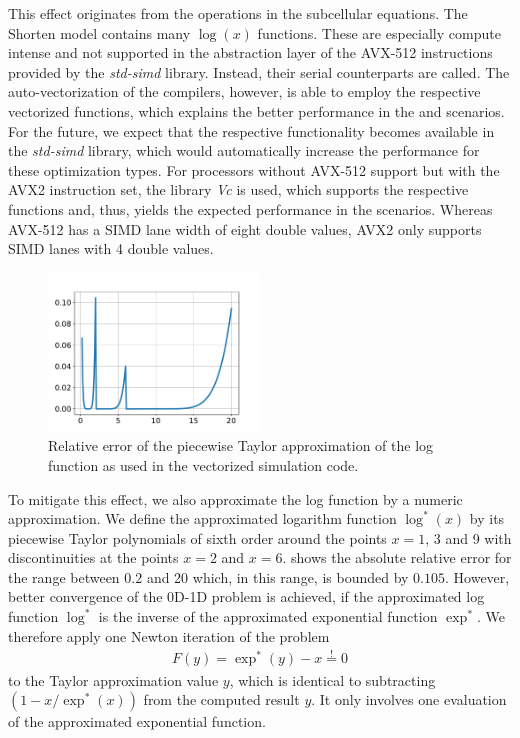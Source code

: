 This effect originates from the operations in the subcellular equations. The Shorten model contains many $\log(x)$ functions. These are especially compute intense and not supported in the abstraction layer of the AVX-512 instructions provided by the \emph{std-simd} library. Instead, their serial counterparts are called. The auto-vectorization of the compilers, however, is able to employ the respective vectorized functions, which explains the better performance in the  and  scenarios. For the future, we expect that the respective functionality becomes available in the \emph{std-simd} library, which would automatically increase the performance for these optimization types. For processors without AVX-512 support but with the AVX2 instruction set, the library \emph{Vc} is used, which supports the respective functions and, thus, yields the expected performance in the  scenarios. Whereas AVX-512 has a SIMD lane width of eight double values, AVX2 only supports SIMD lanes with 4 double values.

\begin{figure}
  \centering%
  \includegraphics[width=0.5\textwidth]{images/results/studies/apxlog.pdf}%
  \caption{Relative error of the piecewise Taylor approximation of the log function as used in the vectorized simulation code.}%
  \label{fig:apxlog}%
\end{figure}%
To mitigate this effect, we also approximate the log function by a numeric approximation. We define the approximated logarithm function $\log^\ast(x)$ by its piecewise Taylor polynomials of sixth order around the points $x=1$, 3 and 9 with discontinuities at the points $x=2$ and $x=6$.  shows the absolute relative error for the range between $0.2$ and 20 which, in this range, is bounded by $0.105$. However, better convergence of the 0D-1D problem is achieved, if the approximated log function $\log^\ast$ is the inverse of the approximated exponential function $\exp^\ast$. We therefore apply one Newton iteration of the problem %
\begin{align*}
  F(y) = \exp^\ast(y)-x \overset{!}{=} 0  
\end{align*}
%
to the Taylor approximation value $y$, which is identical to subtracting $(1 - x/\exp^\ast(x))$ from the computed result $y$. It only involves one evaluation of the approximated exponential function.

